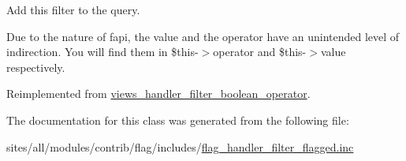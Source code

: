 Add this filter to the query.

Due to the nature of fapi, the value and the operator have an unintended level of indirection. You will find them in \$this-$>$operator and \$this-$>$value respectively. 

Reimplemented from \hyperlink{classviews__handler__filter__boolean__operator_b3afc650701939c060e684d75fa2b21b}{views\_\-handler\_\-filter\_\-boolean\_\-operator}.

The documentation for this class was generated from the following file:\begin{CompactItemize}
\item 
sites/all/modules/contrib/flag/includes/\hyperlink{flag__handler__filter__flagged_8inc}{flag\_\-handler\_\-filter\_\-flagged.inc}\end{CompactItemize}
